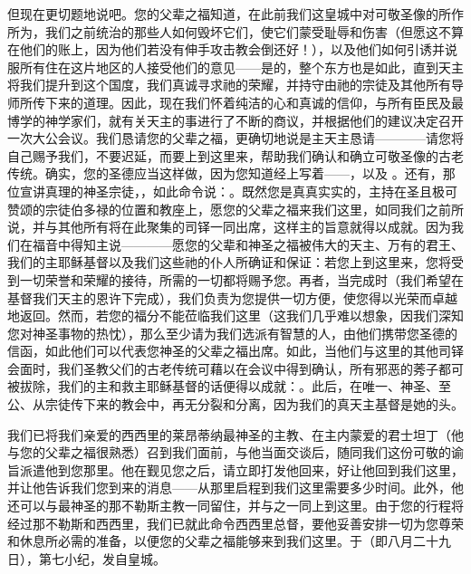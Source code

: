 但现在更切题地说吧。您的父辈之福知道，在此前我们这皇城中对可敬圣像的所作所为，我们之前统治的那些人如何毁坏它们，使它们蒙受耻辱和伤害（但愿这不算在他们的账上，因为他们若没有伸手攻击教会倒还好！），以及他们如何引诱并说服所有住在这片地区的人接受他们的意见——是的，整个东方也是如此，直到天主将我们提升到这个国度，我们真诚寻求祂的荣耀，并持守由祂的宗徒及其他所有导师所传下来的道理。因此，现在我们怀着纯洁的心和真诚的信仰，与所有臣民及最博学的神学家们，就有关天主的事进行了不断的商议，并根据他们的建议决定召开一次大公会议。我们恳请您的父辈之福，更确切地说是主天主恳请————请您将自己赐予我们，不要迟延，而要上到这里来，帮助我们确认和确立可敬圣像的古老传统。确实，您的圣德应当这样做，因为您知道经上写着——，以及 。还有，那位宣讲真理的神圣宗徒，，如此命令说：。既然您是真真实实的，主持在圣且极可赞颂的宗徒伯多禄的位置和教座上，愿您的父辈之福来我们这里，如同我们之前所说，并与其他所有将在此聚集的司铎一同出席，这样主的旨意就得以成就。因为我们在福音中得知主说————愿您的父辈和神圣之福被伟大的天主、万有的君王、我们的主耶稣基督以及我们这些祂的仆人所确证和保证：若您上到这里来，您将受到一切荣誉和荣耀的接待，所需的一切都将赐予您。再者，当完成时（我们希望在基督我们天主的恩许下完成），我们负责为您提供一切方便，使您得以光荣而卓越地返回。然而，若您的福分不能莅临我们这里（这我们几乎难以想象，因我们深知您对神圣事物的热忱），那么至少请为我们选派有智慧的人，由他们携带您圣德的信函，如此他们可以代表您神圣的父辈之福出席。如此，当他们与这里的其他司铎会面时，我们圣教父们的古老传统可藉以在会议中得到确认，所有邪恶的莠子都可被拔除，我们的主和救主耶稣基督的话便得以成就：。此后，在唯一、神圣、至公、从宗徒传下来的教会中，再无分裂和分离，因为我们的真天主基督是她的头。\par

我们已将我们亲爱的西西里的莱昂蒂纳最神圣的主教、在主内蒙爱的君士坦丁（他与您的父辈之福很熟悉）召到我们面前，与他当面交谈后，随同我们这份可敬的谕旨派遣他到您那里。他在觐见您之后，请立即打发他回来，好让他回到我们这里，并让他告诉我们您到来的消息——从那里启程到我们这里需要多少时间。此外，他还可以与最神圣的那不勒斯主教一同留住，并与之一同上到这里。由于您的行程将经过那不勒斯和西西里，我们已就此命令西西里总督，要他妥善安排一切为您尊荣和休息所必需的准备，以便您的父辈之福能够来到我们这里。于（即八月二十九日），第七小纪，发自皇城。\par

